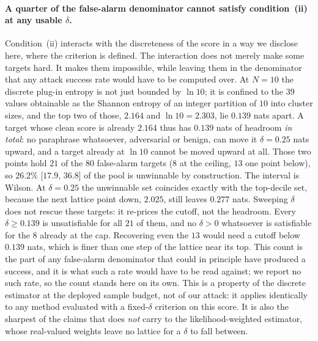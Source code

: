 \paragraph{A quarter of the false-alarm denominator cannot satisfy condition~(ii) at any
usable $\delta$.}
Condition~(ii) interacts with the discreteness of the score in a way we disclose here, where
the criterion is defined. The interaction does not merely make some targets hard. It makes
them impossible, while leaving them in the denominator that any attack success rate would
have to be computed over. At $N{=}10$ the
discrete plug-in entropy is not just bounded by $\ln 10$; it is confined to the $39$ values obtainable
as the Shannon entropy of an integer partition of $10$ into cluster sizes, and the top two of
those, $2.164$ and $\ln 10 = 2.303$, lie $0.139$ nats apart. A target whose clean score is
already $2.164$ thus has $0.139$ nats of headroom \emph{in total}: no paraphrase whatsoever,
adversarial or benign, can move it $\delta{=}0.25$ nats upward, and a target already at
$\ln 10$ cannot be moved upward at all. Those two points hold $21$ of the $80$ false-alarm
targets ($8$ at the ceiling, $13$ one point below), so $26.2\%$ [$17.9$, $36.8$] of the pool
is unwinnable by construction. The interval is Wilson. At $\delta{=}0.25$ the unwinnable set
coincides exactly with the top-decile set, because the next lattice point down, $2.025$,
still leaves $0.277$ nats.
Sweeping $\delta$ does not rescue these targets: it re-prices the cutoff, not
the headroom. Every $\delta \geq 0.139$ is unsatisfiable for all $21$ of them, and no
$\delta > 0$ whatsoever is satisfiable for the $8$ already at the cap. Recovering even the
$13$ would need a cutoff below $0.139$ nats, which is finer than one step of the lattice near
its top.
This count is the part of any false-alarm denominator that could in principle have produced a
success, and it is what such a rate would have to be read against; we report no such rate, so
the count stands here on its own.
This is a property of the discrete estimator at the deployed sample budget, not of our attack:
it applies identically to any method evaluated with a fixed-$\delta$ criterion on this score.
It is also the sharpest of the claims that does \emph{not} carry to the likelihood-weighted
estimator, whose real-valued weights leave no lattice for a $\delta$ to fall between.

